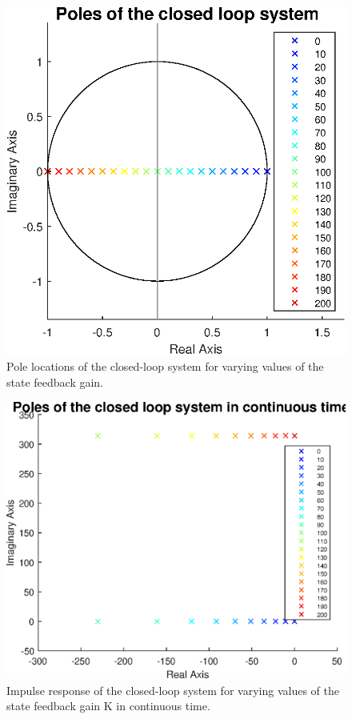 \documentclass[a4paper,kul]{kulakarticle} %
\begin{document}
\begin{figure}[htp!]
	\centering
	\includegraphics[width=0.5\linewidth]{poles.eps}
	\caption{Pole locations of the closed-loop system for varying values of the state feedback gain.}
	\label{fig:poles}
\end{figure}




\begin{figure}
	\centering
	\includegraphics[width=0.5\linewidth]{poles_cont.eps}
	\caption{Impulse response of the closed-loop system for varying values of the state feedback gain K in continuous time.} 
	\label{fig:poles cont}
\end{figure}
\newpage
\end{document}
